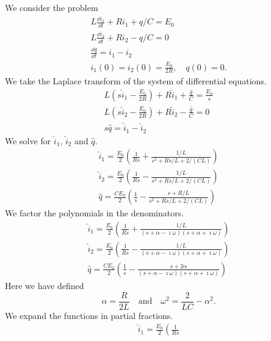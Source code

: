{%
\begin{Solution}
  \label{solution circuit i1 i2 q}
  We consider the problem
  \begin{gather*}
    L \frac{\dd i_1}{\dd t} + R i_1 + q / C = E_0\\
    L \frac{\dd i_2}{\dd t} + R i_2 - q / C = 0\\
    \frac{\dd q}{\dd t} = i_1 - i_2 \\
    i_1(0)=i_2(0)=\frac{E_0}{2R},\quad q(0) = 0.
  \end{gather*}
  We take the Laplace transform of the system of differential equations.
  \begin{gather*}
    L \left( s \hat{i}_1 - \frac{E_0}{2 R} \right) + R \hat{i}_1 
    + \frac{ \hat{q} }{C} = \frac{E_0}{s} \\
    L \left( s \hat{i}_2 - \frac{E_0}{2 R} \right) + R \hat{i}_2 
    - \frac{ \hat{q} }{C} = 0 \\
    s \hat{q} = \hat{i}_1 - \hat{i}_2
  \end{gather*}
  We solve for $\hat{i}_1$, $\hat{i}_2$ and $\hat{q}$.
  \begin{gather*}
    \hat{i}_1 = \frac{E_0}{2} \left( \frac{1}{R s} 
      + \frac{1/L}{ s^2 + R s / L + 2 / (C L) } \right) \\
    \hat{i}_2 = \frac{E_0}{2} \left( \frac{1}{R s} 
      - \frac{1/L}{ s^2 + R s / L + 2 / (C L) } \right) \\
    \hat{q} = \frac{C E_0}{2} \left( \frac{1}{s}
      - \frac{ s + R/L }{ s^2 + R s / L + 2 / (C L) } \right)
  \end{gather*}
  We factor the polynomials in the denominators.
  \begin{gather*}
    \hat{i}_1 = \frac{E_0}{2} \left( \frac{1}{R s} 
      + \frac{1/L}{ (s + \alpha - \imath \omega)(s + \alpha + \imath \omega) } \right) \\
    \hat{i}_2 = \frac{E_0}{2} \left( \frac{1}{R s} 
      - \frac{1/L}{ (s + \alpha - \imath \omega)(s + \alpha + \imath \omega) } \right) \\
    \hat{q} = \frac{C E_0}{2} \left( \frac{1}{s}
      - \frac{ s + 2 \alpha }{ (s + \alpha - \imath \omega)(s + \alpha + \imath \omega) } \right)
  \end{gather*}
  Here we have defined
  \[
  \alpha = \frac{R}{2L} \quad \mathrm{and} \quad \omega^2 = \frac{2}{LC} - \alpha^2.
  \]
  We expand the functions in partial fractions.
  \begin{gather*}
    \hat{i}_1 = \frac{E_0}{2} \left( \frac{1}{R s} 

\end{gather*}
\end{Solution}}
